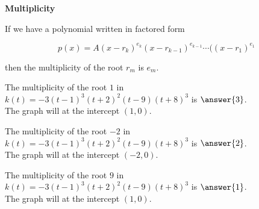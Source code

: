 \documentclass{ximera}
\author{Lee Wayand}
\begin{document}
\begin{exercise}






\begin{idea} \textbf{\textcolor{blue!55!black}{Multiplicity}}


If we have a polynomial written in factored form

\[
p(x) = A (x-r_k)^{e_k} (x-r_{k-1})^{e_{k-1}}  \cdots ((x-r_1)^{e_1}
\]

then the multiplicity of the root $r_m$ is $e_m$. \\





\end{idea}









\begin{question}



The multiplicity of the root $1$ in $k(t) = -3(t - 1)^3 (t + 2)^2 (t - 9) (t + 8)^3$ is $\answer{3}$. \\



The graph will  at the intercept $(1, 0)$.


\end{question}











\begin{question}



The multiplicity of the root $-2$ in $k(t) = -3(t - 1)^3 (t + 2)^2 (t - 9) (t + 8)^3$ is $\answer{2}$. \\



The graph will  at the intercept $(-2, 0)$.


\end{question}











\begin{question}



The multiplicity of the root $9$ in $k(t) = -3(t - 1)^3 (t + 2)^2 (t - 9) (t + 8)^3$ is $\answer{1}$. \\



The graph will  at the intercept $(1, 0)$.


\end{question}














\end{exercise}
\end{document}
